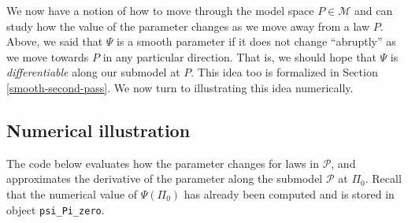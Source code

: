 \documentclass[11pt,openright,twoside]{book}
\newcommand{\calM}{\mathcal{M}}
\newcommand{\calP}{\mathcal{P}}
\theoremstyle{definition}
\theoremstyle{definition}
\theoremstyle{definition}
\theoremstyle{remark}
\begin{document}
We now have a notion of how to move through the model space \(P \in \calM\) and
can study how the value of the parameter changes as we move away from a law
\(P\). Above, we said that \(\Psi\) is a smooth parameter if it does not change
``abruptly'' as we move towards \(P\) in any particular direction. That is, we
should hope that \(\Psi\) is \emph{differentiable} along our submodel at \(P\). This idea too is formalized in Section \ref{smooth-second-pass}. We now turn
to illustrating this idea numerically.

\hypertarget{numerical-illus}{%
\subsection{Numerical illustration}\label{numerical-illus}}

The code below evaluates how the parameter changes for laws in \(\calP\), and
approximates the derivative of the parameter along the submodel \(\calP\) at
\(\Pi_0\). Recall that the numerical value of \(\Psi(\Pi_{0})\) has already been
computed and is stored in object \texttt{psi\_Pi\_zero}.
\end{document}
